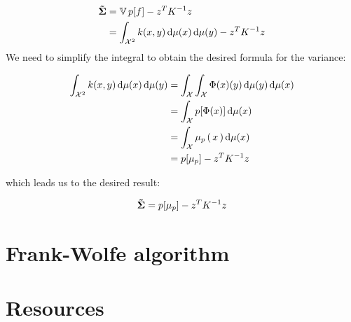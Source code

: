   \begin{align*}
    \mathbf{\tilde{\Sigma}} &= \mathbb{V} \,p[f] - z ^ { T } K ^ { - 1 } z\\
    &= \int_{\mathcal{X}^2}  k(x,y) \mathop{}\mathopen{}\mathrm{d} \mu(x) \mathop{}\mathopen{}\mathrm{d} \mu(y) - z ^ { T } K ^ { - 1 } z\\
  \end{align*}
We need to simplify the integral to obtain the desired formula for the variance:
\begin{boxitemize}
\begin{align*}
  \int_{\mathcal{X}^2}  k(x,y) \mathop{}\mathopen{}\mathrm{d} \mu(x) \mathop{}\mathopen{}\mathrm{d} \mu(y) &= \int_{\mathcal{X}} \int_{\mathcal{X}} \Phi(x)(y) \mathop{}\mathopen{}\mathrm{d} \mu(y) \mathop{}\mathopen{}\mathrm{d} \mu(x) \\
  &= \int_{\mathcal{X}} p[\Phi(x)] \mathop{}\mathopen{}\mathrm{d} \mu(x) \\
  &= \int_{\mathcal{X}} \mu_p\left( \, x \, \right) \mathop{}\mathopen{}\mathrm{d} \mu(x) \\
  &=  p[\mu_p] - z ^ { T } K ^ { - 1 } z
\end{align*}
\end{boxitemize}
which leads us to the desired result:
\begin{boxtheorem}
  $$\mathbf{\tilde{\Sigma}} = p[\mu_p] -z ^ { T } K ^ { - 1 } z$$
\end{boxtheorem}


\section{Frank-Wolfe algorithm}
\label{sec:FW}

\section*{Resources}
\label{sec:bibli}

\nocite{*}
\printbibliography[heading=none]
